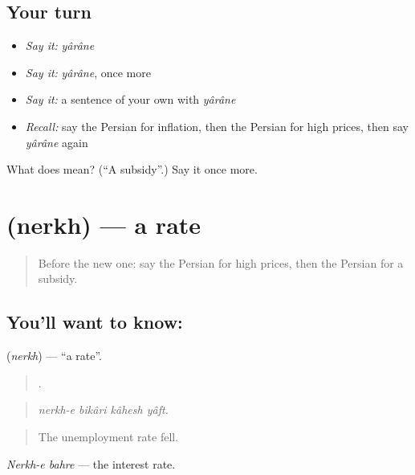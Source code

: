 \subsection*{Your turn}
\begin{itemize}
\raggedright
  \item \emph{Say it:} \emph{yârâne}
  \item \emph{Say it:} \emph{yârâne}, once more
  \item \emph{Say it:} a sentence of your own with \emph{yârâne}
  \item \emph{Recall:} say the Persian for inflation, then the Persian for high prices, then say \emph{yârâne} again
\end{itemize}

\begin{tcolorbox}[breakable,colback=teal!4,colframe=teal!35!black,title={Before you move on}]
What does  mean? (\textquotedblleft{}A subsidy\textquotedblright{}.) Say it once more.
\end{tcolorbox}
\section[\texorpdfstring{\fa{نرخ} (nerkh)}{نرخ (nerkh)}]{ (nerkh) — a rate}

\label{lesson:FA-C413-nerkh}



\begin{quote}
Before the new one: say the Persian for high prices, then the Persian for a subsidy.
\end{quote}

\subsection*{You'll want to know: }
\textbf{} (\emph{nerkh}) — \textquotedblleft{}a rate\textquotedblright{}.

\begin{quote}
   .
\end{quote}

\begin{quote}
\emph{nerkh-e bikâri kâhesh yâft.}
\end{quote}

\begin{quote}
The unemployment rate fell.
\end{quote}

\emph{Nerkh-e bahre} — the interest rate.

